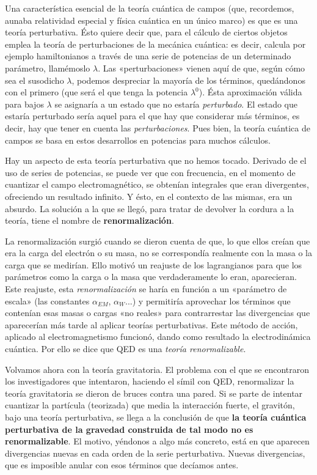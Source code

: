 \documentclass[11pt,a4paper,titlepage]{article}
\begin{document}
Una característica esencial de la teoría cuántica de campos (que, recordemos, aunaba relatividad especial y física cuántica en un único marco) es que es una teoría perturbativa. Ésto quiere decir que, para el cálculo de ciertos objetos emplea la teoría de perturbaciones de la mecánica cuántica: es decir, calcula por ejemplo hamiltonianos a través de una serie de potencias de un determinado parámetro, llamémoslo $\lambda$. Las «perturbaciones» vienen aquí de que, según cómo sea el susodicho $\lambda$, podemos despreciar la mayoría de los términos, quedándonos con el primero (que será el que tenga la potencia $\lambda^0$). Ésta aproximación válida para bajos $\lambda$ se asignaría a un estado que no estaría \textit{perturbado}. El estado que estaría perturbado sería aquel para el que hay que considerar más términos, es decir, hay que tener en cuenta las \textit{perturbaciones}. Pues bien, la teoría cuántica de campos se basa en estos desarrollos en potencias para muchos cálculos.

Hay un aspecto de esta teoría perturbativa que no hemos tocado. Derivado de el uso de series de potencias, se puede ver que con frecuencia, en el momento de cuantizar el campo electromagnético, se obtenían integrales que eran divergentes, ofreciendo un resultado infinito. Y ésto, en el contexto de las mismas, era un absurdo. La solución a la que se llegó, para tratar de devolver la cordura a la teoría, tiene el nombre de \textbf{renormalización}.

La renormalización surgió cuando se dieron cuenta de que, lo que ellos creían que era la carga del electrón o su masa, no se correspondía realmente con la masa o la carga que se medirían. Ello motivó un reajuste de los lagrangianos para que los parámetros como la carga o la masa que verdaderamente lo eran, aparecieran. Este reajuste, esta \textit{renormalización} se haría en función a un «parámetro de escala» (las constantes $\alpha_{EM}$, $\alpha_W$...) y permitiría aprovechar los términos que contenían esas masas o cargas «no reales» para contrarrestar las divergencias que aparecerían más tarde al aplicar teorías perturbativas. Este método de acción, aplicado al electromagnetismo funcionó, dando como resultado la electrodinámica cuántica. Por ello se dice que QED es una \textit{teoría renormalizable}.

Volvamos ahora con la teoría gravitatoria. El problema con el que se encontraron los investigadores que intentaron, haciendo el símil con QED, renormalizar la teoría gravitatoria se dieron de bruces contra una pared. Si se parte de intentar cuantizar la partícula (teorizada) que media la interacción fuerte, el gravitón, bajo una teoría perturbativa, se llega a la conclusión de que \textbf{la teoría cuántica perturbativa de la gravedad construida de tal modo no es renormalizable}. El motivo, yéndonos a algo más concreto, está en que aparecen divergencias nuevas en cada orden de la serie perturbativa. Nuevas divergencias, que es imposible anular con esos términos que decíamos antes.
\end{document}

